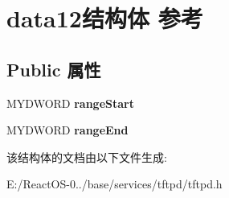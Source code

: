 \hypertarget{structdata12}{}\section{data12结构体 参考}
\label{structdata12}
\subsection*{Public 属性}
\begin{DoxyCompactItemize}
\item 
\mbox{\label{structdata12_a1970cbc95efaacebf8e806a1c1b47330}} 
M\+Y\+D\+W\+O\+RD {\bfseries range\+Start}
\item 
\mbox{\label{structdata12_a027ba80d34afe553020b3b06603a4a7d}} 
M\+Y\+D\+W\+O\+RD {\bfseries range\+End}
\end{DoxyCompactItemize}


该结构体的文档由以下文件生成\+:\begin{DoxyCompactItemize}
\item 
E\+:/\+React\+O\+S-\/0../base/services/tftpd/tftpd.\+h\end{DoxyCompactItemize}
